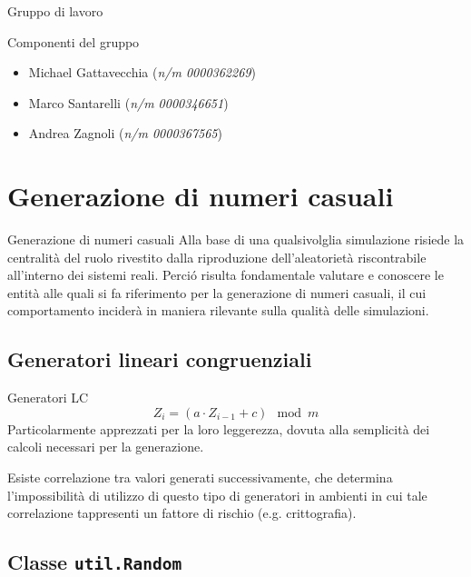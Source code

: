 \documentclass[slidestop,compress,mathserif]{beamer}
\begin{document}
\begin{frame}{Gruppo di lavoro}
	\begin{block}{Componenti del gruppo}
	\begin{itemize}
		\item Michael Gattavecchia (\emph{n\slash m 0000362269})
		\item Marco Santarelli (\emph{n\slash m 0000346651})
		\item Andrea Zagnoli (\emph{n\slash m 0000367565})
	\end{itemize}
	\end{block}
\end{frame}

\section{Generazione di numeri casuali}
\begin{frame}{Generazione di numeri casuali}
\vfill
Alla base di una qualsivolglia simulazione risiede la centralit\`a del ruolo rivestito dalla riproduzione dell'aleatoriet\`a riscontrabile all'interno dei sistemi reali.
\vfill
Perci\'o risulta fondamentale valutare e conoscere le entit\`a alle quali si fa riferimento per la generazione di numeri casuali, il cui comportamento incider\`a in maniera rilevante sulla qualit\`a delle simulazioni.
\vfill
\end{frame}

\subsection{Generatori lineari congruenziali}

\begin{frame}{Generatori LC}
\vfill
$$
Z_{i}=(a \cdot Z_{i-1}+c)\mod m
$$
\vfill
Particolarmente apprezzati per la loro leggerezza, dovuta alla semplicit\`a dei calcoli necessari per la generazione. 

Esiste correlazione tra valori generati successivamente, che determina l'impossibilit\`a di utilizzo di questo tipo di generatori in ambienti in cui tale correlazione tappresenti un fattore di rischio (e.g. crittografia).
\vfill
\end{frame}

\subsection{Classe {\tt util.Random}}
\end{document}
